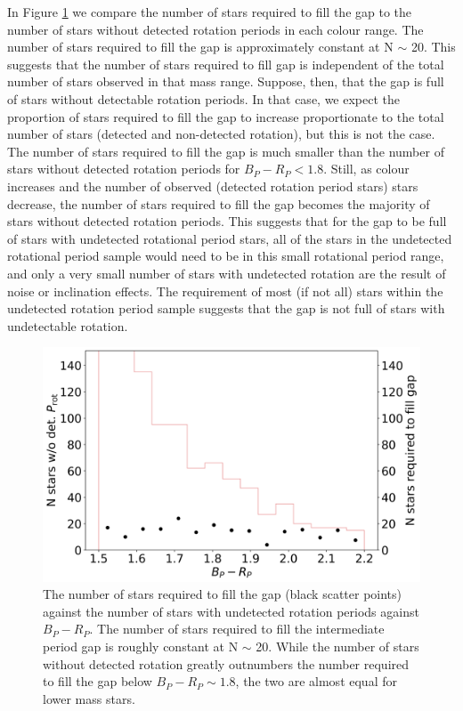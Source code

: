 In Figure \ref{fig:stars_not_fill} we compare the number of stars required to fill the gap to the number of stars without detected rotation periods in each colour range.
The number of stars required to fill the gap is approximately constant at N $\sim$ 20.
This suggests that the number of stars required to fill gap is independent of the total number of stars observed in that mass range.
Suppose, then, that the gap is full of stars without detectable rotation periods.
In that case, we expect the proportion of stars required to fill the gap to increase proportionate to the total number of stars (detected and non-detected rotation), but this is not the case.
The number of stars required to fill the gap is much smaller than the number of stars without detected rotation periods for $B_P-R_P<1.8$. 
Still, as colour increases and the number of observed (detected rotation period stars) stars decrease, the number of stars required to fill the gap becomes the majority of stars without detected rotation periods.
This suggests that for the gap to be full of stars with undetected rotational period stars, all of the stars in the undetected rotational period sample would need to be in this small rotational period range, and only a very small number of stars with undetected rotation are the result of noise or inclination effects.
The requirement of most (if not all) stars within the undetected rotation period sample suggests that the gap is not full of stars with undetectable rotation.

\begin{figure}
\centering
  \includegraphics[width=\textwidth]{Figures/rot_gap_figures/stars_donot_fullgap.png}
  \caption[The number of stars required to fill the gap (black scatter points) against the number of stars with undetected rotation periods against $B_P-R_P$.]{
  	The number of stars required to fill the gap (black scatter points) against the number of stars with undetected rotation periods against $B_P-R_P$. The number of stars required to fill the intermediate period gap is roughly constant at N $\sim$ 20. While the number of stars without detected rotation greatly outnumbers the number required to fill the gap below $B_P-R_P \sim 1.8$, the two are almost equal for lower mass stars.
}
  \label{fig:stars_not_fill}
\end{figure}

